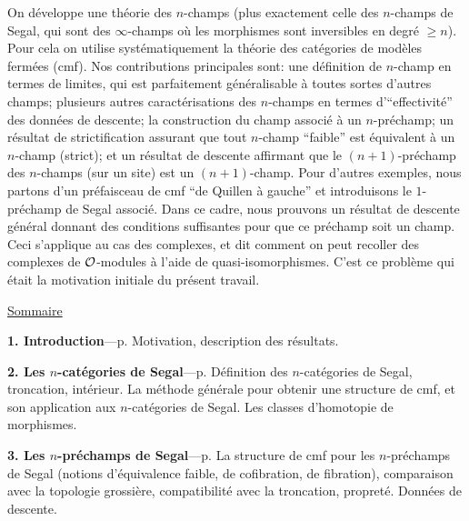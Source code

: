 \documentclass[12pt]{article}
\newcommand{\Oo}{{\cal O}}
\begin{document}
On d\'eveloppe une th\'eorie des $n$-champs (plus exactement celle des
$n$-champs de Segal, qui sont des $\infty$-champs o\`u les morphismes
sont inversibles en degr\'e $\geq n$). Pour cela on utilise
syst\'ematiquement la th\'eorie des cat\'egories de mod\`eles
ferm\'ees (cmf). Nos contributions principales sont: une d\'efinition
de $n$-champ en termes de limites, qui est parfaitement
g\'en\'eralisable \`a toutes sortes d'autres champs; plusieurs autres
caract\'erisations des $n$-champs en termes d'``effectivit\'e'' des
donn\'ees de descente; la construction du champ associ\'e \`a un
$n$-pr\'echamp; un r\'esultat de strictification assurant que tout
$n$-champ ``faible'' est \'equivalent \`a un
$n$-champ (strict); et un r\'esultat de descente affirmant que le
$(n+1)$-pr\'echamp des $n$-champs (sur un site) est un $(n+1)$-champ.
Pour d'autres exemples, nous partons d'un pr\'efaisceau de cmf ``de
Quillen \`a gauche'' et introduisons le $1$-pr\'echamp de Segal associ\'e.
Dans ce cadre, nous prouvons un r\'esultat de descente g\'en\'eral
donnant des conditions suffisantes pour que ce pr\'echamp soit un
champ. Ceci s'applique au cas des complexes, et dit comment on
peut recoller des complexes de $\Oo$-modules \`a l'aide de
quasi-isomorphismes. C'est ce probl\`eme qui \'etait la motivation
initiale du pr\'esent travail.

\newpage

\begin{center}
{\Large \underline{Sommaire}}
\end{center}

\noindent
{\bf 1. Introduction}---p. \pageref{intropage}
\newline
{\small
Motivation, description des r\'esultats.
}

\noindent
{\bf 2. Les $n$-cat\'egories de Segal}---p. \pageref{ncatsegpage}
\newline
{\small
D\'efinition des $n$-cat\'egories de Segal,
troncation, int\'erieur. La m\'ethode
g\'en\'erale pour obtenir une structure de cmf, et son
application aux $n$-cat\'egories de Segal.
Les classes d'homotopie de morphismes.}


\noindent
{\bf 3. Les $n$-pr\'echamps de Segal}---p. \pageref{nchampsegpage}
\newline
{\small
La structure de cmf pour les $n$-pr\'echamps de Segal (notions d'\'equivalence
faible, de
cofibration, de fibration), comparaison avec la topologie grossi\`ere,
compatibilit\'e avec la troncation, propret\'e. Donn\'ees de descente.
}
\end{document}
